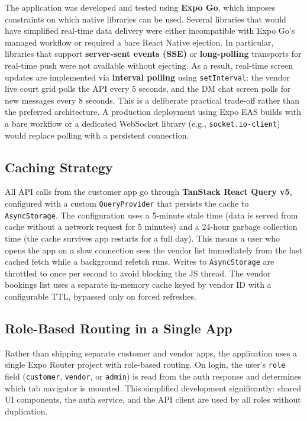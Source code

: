 The application was developed and tested using \textbf{Expo Go}, which imposes constraints on which native libraries can be used. Several libraries that would have simplified real-time data delivery were either incompatible with Expo Go's managed workflow or required a bare React Native ejection. In particular, libraries that support \textbf{server-sent events (SSE)} or \textbf{long-polling} transports for real-time push were not available without ejecting. As a result, real-time screen updates are implemented via \textbf{interval polling} using \texttt{setInterval}: the vendor live court grid polls the API every 5 seconds, and the DM chat screen polls for new messages every 8 seconds. This is a deliberate practical trade-off rather than the preferred architecture. A production deployment using Expo EAS builds with a bare workflow or a dedicated WebSocket library (e.g., \texttt{socket.io-client}) would replace polling with a persistent connection.

\subsection{Caching Strategy}

All API calls from the customer app go through \textbf{TanStack React Query v5}, configured with a custom \texttt{QueryProvider} that persists the cache to \texttt{AsyncStorage}. The configuration uses a 5-minute stale time (data is served from cache without a network request for 5 minutes) and a 24-hour garbage collection time (the cache survives app restarts for a full day). This means a user who opens the app on a slow connection sees the vendor list immediately from the last cached fetch while a background refetch runs. Writes to \texttt{AsyncStorage} are throttled to once per second to avoid blocking the JS thread. The vendor bookings list uses a separate in-memory cache keyed by vendor ID with a configurable TTL, bypassed only on forced refreshes.

\subsection{Role-Based Routing in a Single App}

Rather than shipping separate customer and vendor apps, the application uses a single Expo Router project with role-based routing. On login, the user's \texttt{role} field (\texttt{customer}, \texttt{vendor}, or \texttt{admin}) is read from the auth response and determines which tab navigator is mounted. This simplified development significantly: shared UI components, the auth service, and the API client are used by all roles without duplication.

